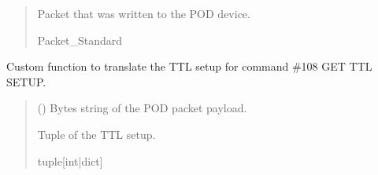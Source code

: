 \documentclass[letterpaper,10pt,english]{sphinxmanual}
\begin{document}
\begin{fulllineitems}
\begin{fulllineitems}
\begin{quote}
\begin{description}
\begin{itemize}
\end{itemize}

\sphinxAtStartPar
Packet that was written to the POD device.

\sphinxAtStartPar
Packet\_Standard

\end{description}\end{quote}

\end{fulllineitems}


\begin{fulllineitems}
\label{\detokenize{Morelia.Devices:Morelia.Devices.PodDevice_8480SC.Pod8480SC._Custom108GETTTLSETUP}}
\pysigstartsignatures
{}
\pysigstopsignatures
\sphinxAtStartPar
Custom function to translate the TTL setup for command \#108 GET TTL SETUP.
\begin{quote}\begin{description}
\sphinxAtStartPar
{} () \textendash{} Bytes string of the POD packet payload.

\sphinxAtStartPar
Tuple of the TTL setup.

\sphinxAtStartPar
tuple{[}int|dict{]}

\end{description}\end{quote}

\end{fulllineitems}



\end{fulllineitems}
\end{document}
